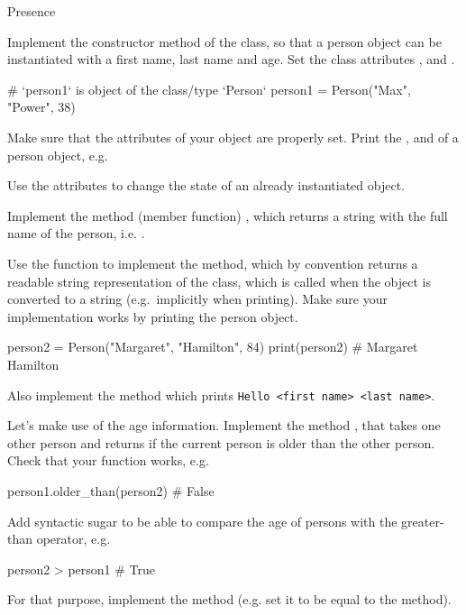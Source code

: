 \documentclass[a4paper, draft=False]{scrartcl}
\begin{document}
\begin{exam}[Presence]{Presence}
\begin{instructions}
\begin{problem*}
      \begin{parts}
      \item Implement the  constructor method of the  class, so
        that a person object can be instantiated with a first name, last
        name and age. Set the class attributes , 
        and .
        \begin{pythoncode}
          # `person1` is object of the class/type `Person`
          person1 = Person("Max", "Power", 38)
        \end{pythoncode}
      \item Make sure that the attributes of your object are properly set.
        Print the ,  and  of a person
        object, e.g. 
      \item Use the attributes to change the state of an already instantiated
         object.
      \item Implement the method (member function) ,
        which returns a string with the full name of the person, i.e.
        .
      \item Use the  function to implement the 
        method, which by convention returns a readable string representation
        of the class, which is called when the object is converted to a string
        (e.g.\ implicitly when printing). Make sure your implementation works
        by printing the person object.
        \begin{pythoncode}
          person2 = Person("Margaret", "Hamilton", 84)
          print(person2)  # Margaret Hamilton
        \end{pythoncode}
      \item Also implement the  method which prints \texttt{Hello <first name> <last name>}.
      \item Let's make use of the age information. Implement the method
        , that takes one other person and returns 
        if the current person is older than the other person. Check that
        your function works, e.g.\
        \begin{pythoncode}
          person1.older_than(person2)  # False
        \end{pythoncode}
      \item Add  syntactic sugar to be able to compare the age of
        persons with the greater-than \py{>} operator, e.g.\
        \begin{pythoncode}
          person2 > person1  # True
        \end{pythoncode}
        For that purpose, implement the  method (e.g. set it to be equal
        to the  method).


\end{parts}
\end{problem*}
\end{instructions}
\end{exam}
\end{document}
